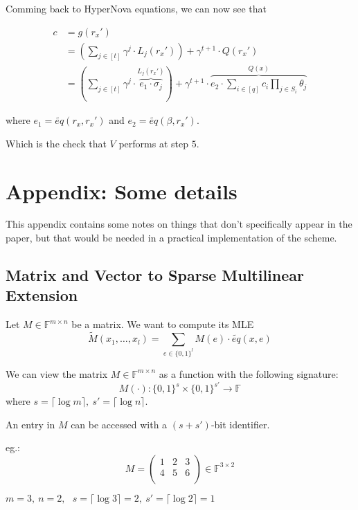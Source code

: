 \documentclass{article}
\theoremstyle{definition}
\begin{document}
\vspace{1cm}

Comming back to HyperNova equations, we can now see that

\begin{align*}
	c &= g(r_x')\\
	  &= \left( \sum_{j \in [t]} \gamma^j \cdot L_j(r_x') \right) + \gamma^{t+1} \cdot Q(r_x')\\
	  &= \left( \sum_{j \in [t]} \gamma^j \cdot \overbrace{e_1 \cdot \sigma_j}^{L_j(r_x')} \right) + \gamma^{t+1} \cdot \overbrace{e_2 \cdot \sum_{i \in [q]} c_i \prod_{j \in S_i} \theta_j}^{Q(x)}
\end{align*}

where $e_1 = \widetilde{eq}(r_x, r_x')$ and $e_2=\widetilde{eq}(\beta, r_x')$.

Which is the check that $V$ performs at step $5$.



\appendix
\section{Appendix: Some details}
This appendix contains some notes on things that don't specifically appear in the paper, but that would be needed in a practical implementation of the scheme.

\subsection{Matrix and Vector to Sparse Multilinear Extension}

Let $M \in \mathbb{F}^{m \times n}$ be a matrix. We want to compute its MLE
$$\widetilde{M}(x_1, \ldots, x_l) = \sum_{e \in \{0, 1 \}^l} M(e) \cdot \widetilde{eq}(x, e)$$

We can view the matrix $M \in \mathbb{F}^{m \times n}$ as a function with the following signature:
$$M(\cdot): \{0,1\}^s \times \{0,1\}^{s'} \rightarrow \mathbb{F}$$
where $s = \lceil \log m \rceil,~ s' = \lceil \log n \rceil$.

An entry in $M$ can be accessed with a $(s+s')$-bit identifier.

eg.:
$$
M = \begin{pmatrix}
1 & 2 & 3\\
4 & 5 & 6\\
\end{pmatrix}
\in \mathbb{F}^{3 \times 2}
$$

$m = 3,~ n = 2,~~~ s = \lceil \log 3 \rceil = 2,~ s' = \lceil \log 2 \rceil = 1$
\end{document}
